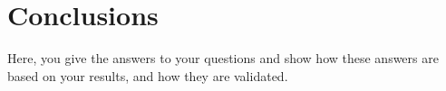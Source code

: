 \chapter{Conclusions}

Here, you give the answers to your questions and show how these answers are based on your results, and how they are validated.
